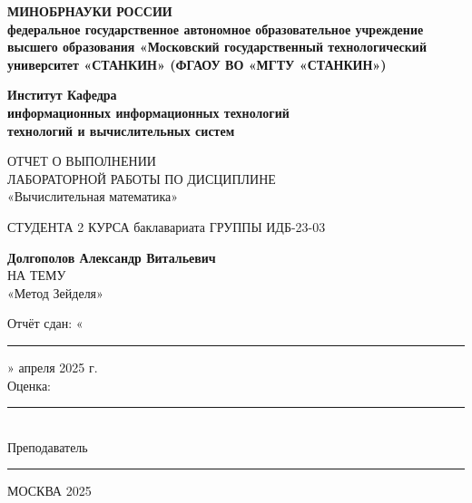 \documentclass{article}
\begin{document}
\addtocounter{page}{-1}
\thispagestyle{empty}
\begin{figure}[h]
    \centering
    \def\svgwidth{0.33\textwidth}
    
\end{figure}
\begin{center}
    \textbf{МИНОБРНАУКИ РОССИИ\\
        федеральное государственное автономное образовательное учреждение
        высшего образования
        «Московский государственный технологический университет «СТАНКИН»
        (ФГАОУ ВО «МГТУ «СТАНКИН»)}
\end{center}
\noindent\makebox[\linewidth]{\rule{\columnwidth}{0.4pt}}
\textbf{Институт \hfill Кафедра \\
    информационных \hfill информационных технологий \\
    технологий \hfill и вычислительных систем}
\\
\vfill
\begin{center}
    ОТЧЕТ О ВЫПОЛНЕНИИ\\
    ЛАБОРАТОРНОЙ РАБОТЫ ПО ДИСЦИПЛИНЕ\\
    «Вычислительная математика»
\end{center}
\vfill
СТУДЕНТА 2 КУРСА \hfill баклавариата \hfill ГРУППЫ ИДБ-23-03\\
\begin{center}
    \textbf{Долгополов Александр Витальевич}
    \noindent\makebox[\linewidth]{\rule{\columnwidth}{1pt}}\\
    НА ТЕМУ\\
    «Метод Зейделя»
\end{center}
\colplacechunks
{}
\colplacechunks
\vfill
\begin{flushleft}
    Отчёт сдан: «\rule{0.4cm}{0.2pt}» апреля 2025 г. \\
    Оценка: \rule{1cm}{0.2pt} \\
    Преподаватель \hspace{0.8cm} \rule{4cm}{0.2pt}
\end{flushleft}
\vfill
\begin{center}
    МОСКВА 2025
\end{center}
\newpage
\end{document}
